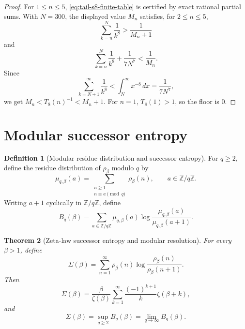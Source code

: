\documentclass[11pt]{article}
\numberwithin{equation}{section}
\newtheorem{theorem}{Theorem}[section]
\theoremstyle{definition}
\newtheorem{definition}[theorem]{Definition}
\theoremstyle{remark}
\newcommand{\Z}{\mathbb Z}
\newcommand{\1}{\mathbf 1}
\begin{document}
\begin{proof}
For \(1\le n\le5\), \eqref{eq:tail-s8-finite-table} is certified by exact rational partial sums.  With \(N=300\), the displayed value \(M_n\) satisfies, for \(2\le n\le5\),
\begin{equation}
\label{eq:tail-s8-finite-lower}
\sum_{k=n}^{N}\frac1{k^8}>\frac1{M_n+1}
\end{equation}
and
\begin{equation}
\label{eq:tail-s8-finite-upper}
\sum_{k=n}^{N}\frac1{k^8}+\frac1{7N^7}<\frac1{M_n}.
\end{equation}
Since
\begin{equation}
\label{eq:tail-s8-integral-tail}
\sum_{k=N+1}^{\infty}\frac1{k^8}<\int_N^\infty x^{-8}\,dx=\frac1{7N^7},
\end{equation}
we get \(M_n<T_8(n)^{-1}<M_n+1\).  For \(n=1\), \(T_8(1)>1\), so the floor is \(0\).
\end{proof}

\section{Modular successor entropy}

\begin{definition}[Modular residue distribution and successor entropy]
\label{def:modular-residue-successor}
For \(q\ge2\), define the residue distribution of \(\rho_\beta\) modulo \(q\) by
\begin{equation}
\label{eq:modular-residue-distribution}
\mu_{q,\beta}(a)=
\sum_{\substack{n\ge1\\ n\equiv a\pmod q}}\rho_\beta(n),
\qquad a\in\Z/q\Z.
\end{equation}
Writing \(a+1\) cyclically in \(\Z/q\Z\), define
\begin{equation}
\label{eq:modular-successor-entropy}
B_q(\beta)=
\sum_{a\in\Z/q\Z}
\mu_{q,\beta}(a)\log\frac{\mu_{q,\beta}(a)}{\mu_{q,\beta}(a+1)}.
\end{equation}
\end{definition}

\begin{theorem}[Zeta-law successor entropy and modular resolution]
\label{thm:successor-entropy}
For every \(\beta>1\), define
\begin{equation}
\label{eq:successor-entropy}
\Sigma(\beta)=\sum_{n=1}^{\infty}\rho_\beta(n)
\log\frac{\rho_\beta(n)}{\rho_\beta(n+1)}.
\end{equation}
Then
\begin{equation}
\label{eq:successor-entropy-series}
\Sigma(\beta)=
\frac{\beta}{\zeta(\beta)}
\sum_{k=1}^{\infty}\frac{(-1)^{k+1}}{k}\zeta(\beta+k),
\end{equation}
and
\begin{equation}
\label{eq:successor-entropy-modular-resolution}
\Sigma(\beta)=\sup_{q\ge2}B_q(\beta)=\lim_{q\to\infty}B_q(\beta).
\end{equation}
\end{theorem}
\end{document}
